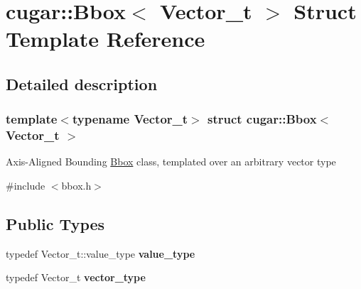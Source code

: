 \hypertarget{structcugar_1_1_bbox}{}\section{cugar\+:\+:Bbox$<$ Vector\+\_\+t $>$ Struct Template Reference}
\label{structcugar_1_1_bbox}


\subsection{Detailed description}
\subsubsection*{template$<$typename Vector\+\_\+t$>$\newline
struct cugar\+::\+Bbox$<$ Vector\+\_\+t $>$}

Axis-\/\+Aligned Bounding \hyperlink{structcugar_1_1_bbox}{Bbox} class, templated over an arbitrary vector type 

{\ttfamily \#include $<$bbox.\+h$>$}

\subsection*{Public Types}
\begin{DoxyCompactItemize}
\item 
\mbox{\label{structcugar_1_1_bbox_ae20c0302102c42620362e7f382605a0d}} 
typedef Vector\+\_\+t\+::value\+\_\+type {\bfseries value\+\_\+type}
\item 
\mbox{\label{structcugar_1_1_bbox_a2898b804f15cf7cbf9b5b667db3e7ea1}} 
typedef Vector\+\_\+t {\bfseries vector\+\_\+type}
\end{DoxyCompactItemize}
